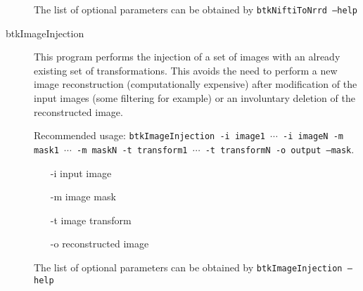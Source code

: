 \begin{description}
The list of optional parameters can be obtained by \texttt{btkNiftiToNrrd
--help}

\item[btkImageInjection] This program performs the injection of a set
of images with an already existing set of transformations. This avoids the need
to perform a new image reconstruction (computationally expensive) after
modification of the input images (some filtering for example) or an involuntary
deletion of the reconstructed image.

Recommended usage: \texttt{btkImageInjection -i image1 $\cdots$ -i
imageN -m mask1 $\cdots$ -m maskN -t transform1 $\cdots$ -t
transformN -o output --mask}.
\begin{itemize}
\item[-i] input image
\item[-m] image mask
\item[-t] image transform
\item[-o] reconstructed image
\end{itemize}

The list of optional parameters can be obtained by \texttt{btkImageInjection
--help}

\end{description}

